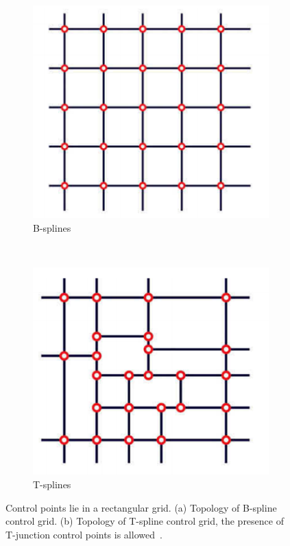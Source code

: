 \begin{figure}[h]
    \centering
    \begin{subfigure}[b]{0.45\textwidth}
        \centering
        \includegraphics[width=\linewidth]{bspline-control-grid}
        \caption{B-splines}
    \end{subfigure}
    ~
    \begin{subfigure}[b]{0.45\textwidth}
        \centering
        \includegraphics[width=\linewidth]{tspline-control-grid}
        \caption{T-splines}
    \end{subfigure}   
    \caption{Control points lie in a rectangular grid. (a) Topology of B-spline control grid. (b) Topology of T-spline
    control grid, the presence of T-junction control points is allowed~\cite{bazilevs_isogeometric_2010}.}\label{fig:Tspline-control-grid}
\end{figure}

